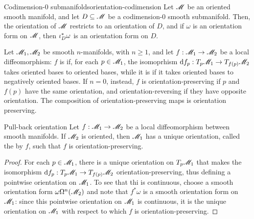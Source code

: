 \begin{proposition}{Codimension-$ 0 $ submanifolds}{orientation-codimension}
  Let $ \mathscr{M} $ be an oriented smooth manifold, and let $ D \subseteq \mathscr{M} $ be a codimension-$ 0 $ smooth submanifold. Then, the orientation of $ \mathscr{M} $ restricts to an orientation of $ D $, and if $ \omega $ is an orientation form on $ \mathscr{M} $, then $ \iota_D^* \omega $ is an orientation form on $ D $.
\end{proposition}

Let $ \mathscr{M}_1 , \mathscr{M}_2 $ be smooth $ n $-manifolds, with $ n \geq 1 $, and let $ f : \mathscr{M}_1 \rightarrow \mathscr{M}_2 $ be a local diffeomorphism\footnotemark: $ f $ is  if, for each $ p \in \mathscr{M}_1 $, the isomoprhism $ \mathrm{d} f_p : T_p\mathscr{M}_1 \rightarrow T_{f(p)}\mathscr{M}_2 $ takes oriented bases to oriented bases, while it is  if it takes oriented bases to negatively oriented bases. If $ n = 0 $, instead, $ f $ is orientation-preserving if $ p $ and $ f(p) $ have the same orientation, and orientation-reversing if they have opposite orientation. The composition of orientation-preserving maps is orientation preserving.


\begin{proposition}{Pull-back orientation}{}
  Let $ f : \mathscr{M}_1 \rightarrow \mathscr{M}_2 $ be a local diffeomorphism between smooth manifolds. If $ \mathscr{M}_2 $ is oriented, then $ \mathscr{M}_1 $ has a unique orientation, called the  by $ f $, such that $ f $ is orientation-preserving.
\end{proposition}

\begin{proofbox}
  \begin{proof}
    For each $ p \in \mathscr{M}_1 $, there is a unique orientation on $ T_p\mathscr{M}_1 $ that makes the isomorphism $ \mathrm{d} f_p : T_p\mathscr{M}_1 \rightarrow T_{f(p)}\mathscr{M}_2 $ orientation-preserving, thus defining a pointwise orientation on $ \mathscr{M}_1 $. To see that thi is continuous, choose a smooth orientation form $ \omega \Omega^{n}(\mathscr{M}_2) $ and note that $ f^* \omega $ is a smooth orientation form on $ \mathscr{M}_1 $: since this pointwise orientation on $ \mathscr{M}_1 $ is continuous, it is the unique orientation on $ \mathscr{M}_1 $ with respect to which $ f $ is orientation-preserving.
  \end{proof}
\end{proofbox}


